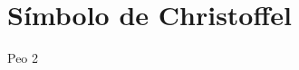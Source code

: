 \documentclass[../main.tex]{subfiles}
\begin{document}
\section{Símbolo de Christoffel}
Peo 2
 
\end{document}
